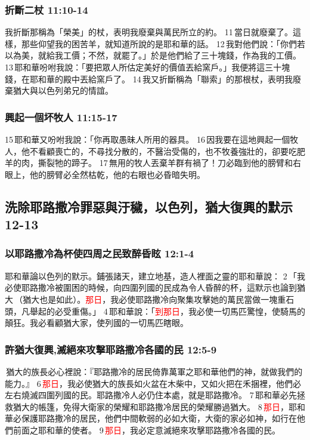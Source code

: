 \subsubsection{折斷二杖 11:10-14}
我折斷那稱為「榮美」的杖，表明我廢棄與萬民所立的約。 11 當日就廢棄了。這樣，那些仰望我的困苦羊，就知道所說的是耶和華的話。 12 我對他們說：「你們若以為美，就給我工價；不然，就罷了。」於是他們給了三十塊錢，作為我的工價。 13 耶和華吩咐我說：「要把眾人所估定美好的價值丟給窯戶。」我便將這三十塊錢，在耶和華的殿中丟給窯戶了。
14 我又折斷稱為「聯索」的那根杖，表明我廢棄猶大與以色列弟兄的情誼。

\subsubsection{興起一個坏牧人 11:15-17}
15 耶和華又吩咐我說：「你再取愚昧人所用的器具。 16 因我要在這地興起一個牧人，他不看顧喪亡的，不尋找分散的，不醫治受傷的，也不牧養強壯的，卻要吃肥羊的肉，撕裂牠的蹄子。 17 無用的牧人丟棄羊群有禍了！刀必臨到他的膀臂和右眼上，他的膀臂必全然枯乾，他的右眼也必昏暗失明。

\subsection{洗除耶路撒冷罪惡與汙穢，以色列，猶大復興的默示 12-13}
\subsubsection{以耶路撒冷為杯使四周之民致醉昏眩 12:1-4}
耶和華論以色列的默示。鋪張諸天，建立地基，造人裡面之靈的耶和華說： 2 「我必使耶路撒冷被圍困的時候，向四圍列國的民成為令人昏醉的杯，這默示也論到猶大 （猶大也是如此）。\textcolor{red}{那日}，我必使耶路撒冷向聚集攻擊她的萬民當做一塊重石頭，凡舉起的必受重傷。」 4 耶和華說：「\textcolor{red}{到那日}，我必使一切馬匹驚惶，使騎馬的顛狂。我必看顧猶大家，使列國的一切馬匹瞎眼。

\subsubsection{許猶大復興,滅絕來攻擊耶路撒冷各國的民 12:5-9}
 猶大的族長必心裡說：『耶路撒冷的居民倚靠萬軍之耶和華他們的神，就做我們的能力。』 6 \textcolor{red}{那日}，我必使猶大的族長如火盆在木柴中，又如火把在禾捆裡，他們必左右燒滅四圍列國的民。耶路撒冷人必仍住本處，就是耶路撒冷。 7 耶和華必先拯救猶大的帳篷，免得大衛家的榮耀和耶路撒冷居民的榮耀勝過猶大。 8 \textcolor{red}{那日}，耶和華必保護耶路撒冷的居民，他們中間軟弱的必如大衛，大衛的家必如神，如行在他們前面之耶和華的使者。 9 \textcolor{red}{那日}，我必定意滅絕來攻擊耶路撒冷各國的民。
